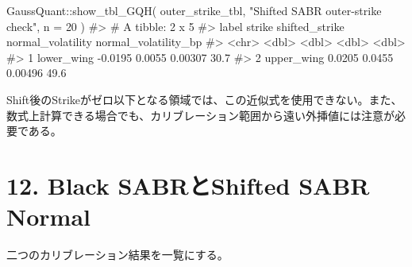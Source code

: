 \documentclass[
  letterpaper,
  DIV=11,
  numbers=noendperiod]{scrreprt}
\newenvironment{Shaded}{\begin{snugshade}}{\end{snugshade}}
\newcommand{\AttributeTok}[1]{\textcolor[rgb]{0.40,0.45,0.13}{#1}}
\newcommand{\CommentTok}[1]{\textcolor[rgb]{0.37,0.37,0.37}{#1}}
\newcommand{\DecValTok}[1]{\textcolor[rgb]{0.68,0.00,0.00}{#1}}
\newcommand{\FunctionTok}[1]{\textcolor[rgb]{0.28,0.35,0.67}{#1}}
\newcommand{\NormalTok}[1]{\textcolor[rgb]{0.00,0.23,0.31}{#1}}
\newcommand{\SpecialCharTok}[1]{\textcolor[rgb]{0.37,0.37,0.37}{#1}}
\newcommand{\StringTok}[1]{\textcolor[rgb]{0.13,0.47,0.30}{#1}}
\begin{document}
\begin{Shaded}
\begin{Highlighting}[]
\NormalTok{GaussQuant}\SpecialCharTok{::}\FunctionTok{show\_tbl\_GQH}\NormalTok{(}
\NormalTok{  outer\_strike\_tbl,}
  \StringTok{"Shifted SABR outer{-}strike check"}\NormalTok{,}
  \AttributeTok{n =} \DecValTok{20}
\NormalTok{)}
\CommentTok{\#\textgreater{} \# A tibble: 2 x 5}
\CommentTok{\#\textgreater{}   label       strike shifted\_strike normal\_volatility normal\_volatility\_bp}
\CommentTok{\#\textgreater{}   \textless{}chr\textgreater{}        \textless{}dbl\textgreater{}          \textless{}dbl\textgreater{}             \textless{}dbl\textgreater{}                \textless{}dbl\textgreater{}}
\CommentTok{\#\textgreater{} 1 lower\_wing {-}0.0195         0.0055           0.00307                 30.7}
\CommentTok{\#\textgreater{} 2 upper\_wing  0.0205         0.0455           0.00496                 49.6}
\end{Highlighting}
\end{Shaded}

Shift後のStrikeがゼロ以下となる領域では、この近似式を使用できない。また、数式上計算できる場合でも、カリブレーション範囲から遠い外挿値には注意が必要である。

\section{12. Black SABRとShifted SABR
Normal}\label{black-sabrux3068shifted-sabr-normal}

二つのカリブレーション結果を一覧にする。
\end{document}
